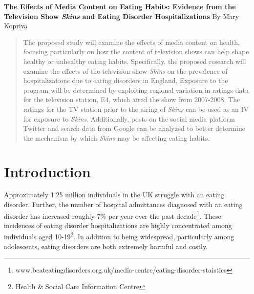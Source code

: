 \documentclass[12pt]{article}
\begin{document}
	
	\singlespacing
	
	
	
	\begin{center}
		
		{\bf {\Large The Effects of Media Content on Eating Habits: Evidence from the Television Show \textit{Skins} and Eating Disorder Hospitalizations}} 
		\vskip20pt
		{\large By Mary Kopriva}
		
		
	\end{center}
	
	\vskip20pt
	
	\begin{abstract}
		
		\onehalfspacing
		
		
		
		{The proposed study will examine the effects of media content on health, focusing particularly on how the content of television shows can help shape healthy or unhealthy eating habits. Specifically, the proposed research will examine the effects of the television show \textit{Skins} on the prevalence of hospitalizations due to eating disorders in England. Exposure to the program will be determined by exploiting regional variation in ratings data for the television station, E4, which aired the show from 2007-2008. The ratings for the TV station prior to the airing of \textit{Skins} can be used as an IV for exposure to \textit{Skins}. Additionally, posts on the social media platform Twitter and search data from Google can be analyzed to better determine the mechanism by which \textit{Skins} may be affecting eating habits.}
		
		
	\end{abstract}		
	
	\pagebreak
	
\section{Introduction}	
	
	\doublespacing

Approximately 1.25 million individuals in the UK struggle with an eating disorder. Further, the number of hospital admittances diagnosed with an eating disorder has increased roughly 7\% per year over the past decade\footnote{www.beateatingdisorders.org.uk/media-centre/eating-disorder-staistics}. These incidences of eating disorder hospitalizations are highly concentrated among individuals aged 10-19\footnote{Health \& Social Care Information Centre}. In addition to being widespread, particularly among adolescents, eating disorders are both extremely harmful and costly. 
\end{document}
